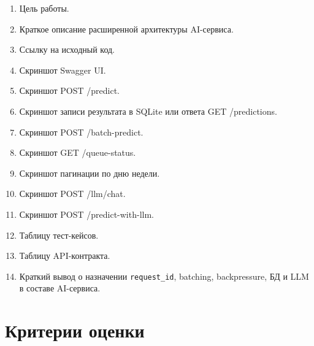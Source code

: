 \documentclass[12pt,a4paper]{article}
\begin{document}
\begin{enumerate}
    \item Цель работы.
    \item Краткое описание расширенной архитектуры AI-сервиса.
    \item Ссылку на исходный код.
    \item Скриншот Swagger UI.
    \item Скриншот POST /predict.
    \item Скриншот записи результата в SQLite или ответа GET /predictions.
    \item Скриншот POST /batch-predict.
    \item Скриншот GET /queue-status.
    \item Скриншот пагинации по дню недели.
    \item Скриншот POST /llm/chat.
    \item Скриншот POST /predict-with-llm.
    \item Таблицу тест-кейсов.
    \item Таблицу API-контракта.
    \item Краткий вывод о назначении \texttt{request\_id}, batching, backpressure, БД и LLM в составе AI-сервиса.
\end{enumerate}

\section{Критерии оценки}
\end{document}
